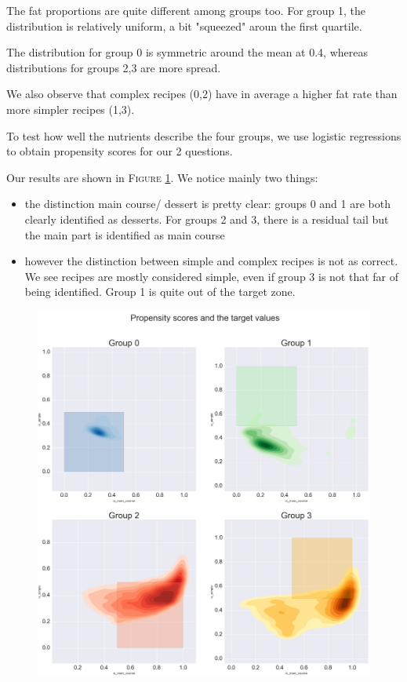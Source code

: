 \documentclass[11pt]{article}
\begin{document}
The fat proportions are quite different among groups too. For group 1, the distribution is relatively uniform, a bit "squeezed" aroun the first quartile.

The distribution for group 0 is symmetric around the mean at 0.4, whereas distributions for groups 2,3 are more spread.

We also observe that complex recipes (0,2) have in average a higher fat rate than more simpler recipes (1,3).


To test how well the nutrients describe the four groups, we use logistic regressions to obtain propensity scores for our 2 questions.

Our results are shown in \textsc{Figure} \ref{fig:end}. We notice mainly two things:
\begin{itemize}
\item the distinction main course/ dessert is pretty clear: groups 0 and 1 are both clearly identified as desserts. For groups 2 and 3, there is a residual tail but the main part is identified as main course
\item however the distinction between simple and complex recipes is not as correct. We see recipes are mostly considered simple, even if group 3 is not that far of being identified. Group 1 is quite out of the target zone.
\end{itemize}
\clearpage
\begin{figure}[!h]
	\captionsetup{justification=raggedright,singlelinecheck=false}
	\includegraphics[width=\textwidth]{../propensity-r.png}
	\caption{}
	\label{fig:end}
\end{figure}
\end{document}

